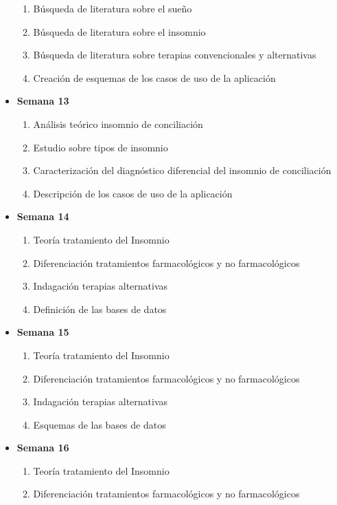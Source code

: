 \documentclass[a4paper,12pt,twoside]{memoir}
\begin{document}
\begin{itemize}
    \begin{enumerate}
        \item Búsqueda de literatura sobre el sueño
        \item Búsqueda de literatura sobre el insomnio
        \item Búsqueda de literatura sobre terapias convencionales y alternativas
        \item Creación de esquemas de los casos de uso de la aplicación
        \end{enumerate}
    \item \textbf{Semana 13}
    \begin{enumerate}
        \item Análisis teórico insomnio de conciliación
        \item Estudio sobre tipos de insomnio
        \item Caracterización del diagnóstico diferencial del insomnio de conciliación
        \item Descripción de los casos de uso de la aplicación
    \end{enumerate}
    \item \textbf{Semana 14}
    \begin{enumerate}
        \item Teoría tratamiento del Insomnio
        \item Diferenciación tratamientos farmacológicos y no farmacológicos
        \item Indagación terapias alternativas
        \item Definición de las bases de datos
    \end{enumerate}
    \item \textbf{Semana 15}
    \begin{enumerate}
        \item Teoría tratamiento del Insomnio
        \item Diferenciación tratamientos farmacológicos y no farmacológicos
        \item Indagación terapias alternativas
        \item Esquemas de las bases de datos
    \end{enumerate}
    \item \textbf{Semana 16}
    \begin{enumerate}
        \item Teoría tratamiento del Insomnio
        \item Diferenciación tratamientos farmacológicos y no farmacológicos

\end{enumerate}
\end{itemize}
\end{document}
